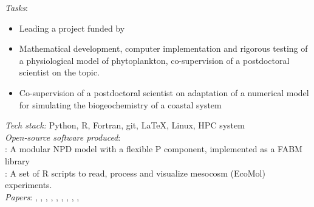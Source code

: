 \documentclass[
	a4paper,
]{fortysecondscv}
\begin{document}
\begin{cvtable}[1.0]
	{\href{https://uol.de/en/icbm}{\color{pblue}{ICBM, University of Oldenburg, Germany}}}
	{\textit{Tasks}:
	\begin{itemize}[topsep=0pt,itemsep=0pt,partopsep=0pt, parsep=0pt, leftmargin=*]
     \item Leading a project funded by \href{https://www.dfg.de/en}{\color{blue}{DFG}}
     \item Mathematical development, computer implementation and rigorous testing of a physiological model of phytoplankton, co-supervision of a postdoctoral scientist on the topic.%
     \item Co-supervision of a postdoctoral scientist on adaptation of a numerical model for simulating the biogeochemistry of a coastal system
    \end{itemize}
      \textit{Tech stack:} Python, R, Fortran, git, \LaTeX, Linux, HPC system\\  
      \textit{Open-source software produced}:\\
      \href{https://github.com/OnurKerimoglu/fabm-nflexpd}{\color{pblue}{FABM-NflexPD}}: A modular NPD model with a flexible P component, implemented as a FABM library\\
      \href{https://github.com/OnurKerimoglu/R-EcoMol}{\color{pblue}{R-EcoMol}}: A set of R scripts to read, process and visualize mesocosm (EcoMol) experiments.\\
      \textit{Papers}:
      \href{https://doi.org/10.1016/j.ecolmodel.2020.109401}{\color{pblue}{1}}, 
      \href{https://doi.org/10.1111/ele.13680}{\color{pblue}{2}}, 
      \href{https://doi.org/10.5194/gmd-14-6025-2021}{\color{pblue}{3}}, 
      \href{https://doi.org/10.3389/fmars.2021.675428}{\color{pblue}{4}}, 
      \href{https://doi.org/10.1002/lno.12005}{\color{pblue}{5}}, 
      \href{https://doi.org/10.3389/fmars.2022.975414}{\color{pblue}{6}}, 
      \href{https://doi.org/10.1016/j.scitotenv.2022.158757}{\color{pblue}{7}},
      \href{https://ospar.org/documents?v=48846}{\color{pblue}{8}}, 
      \href{https://doi.org/10.5194/egusphere-2022-493}{\color{pblue}{9}}, 
      \href{https://doi.org/10.1101/2022.05.18.492269}{\color{pblue}{10}}
    }
    

\end{cvtable}
\end{document}
